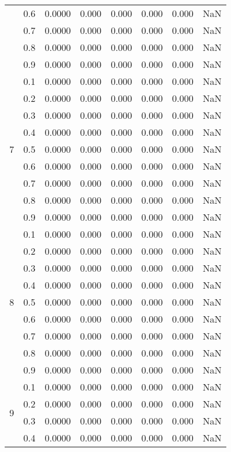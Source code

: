 \documentclass[11pt,a4paper]{report}
\begin{document}
\begin{longtable}{ | c | c || c | c | c | c | c | c | }
 & 0.6 & 0.0000 & 0.000 & 0.000 & 0.000 & 0.000 & NaN \\
 & 0.7 & 0.0000 & 0.000 & 0.000 & 0.000 & 0.000 & NaN \\
 & 0.8 & 0.0000 & 0.000 & 0.000 & 0.000 & 0.000 & NaN \\
 & 0.9 & 0.0000 & 0.000 & 0.000 & 0.000 & 0.000 & NaN \\
 \hline
\multirow{9}{*}{7} & 0.1 & 0.0000 & 0.000 & 0.000 & 0.000 & 0.000 & NaN \\
 & 0.2 & 0.0000 & 0.000 & 0.000 & 0.000 & 0.000 & NaN \\
 & 0.3 & 0.0000 & 0.000 & 0.000 & 0.000 & 0.000 & NaN \\
 & 0.4 & 0.0000 & 0.000 & 0.000 & 0.000 & 0.000 & NaN \\
 & 0.5 & 0.0000 & 0.000 & 0.000 & 0.000 & 0.000 & NaN \\
 & 0.6 & 0.0000 & 0.000 & 0.000 & 0.000 & 0.000 & NaN \\
 & 0.7 & 0.0000 & 0.000 & 0.000 & 0.000 & 0.000 & NaN \\
 & 0.8 & 0.0000 & 0.000 & 0.000 & 0.000 & 0.000 & NaN \\
 & 0.9 & 0.0000 & 0.000 & 0.000 & 0.000 & 0.000 & NaN \\
 \hline
\multirow{9}{*}{8} & 0.1 & 0.0000 & 0.000 & 0.000 & 0.000 & 0.000 & NaN \\
 & 0.2 & 0.0000 & 0.000 & 0.000 & 0.000 & 0.000 & NaN \\
 & 0.3 & 0.0000 & 0.000 & 0.000 & 0.000 & 0.000 & NaN \\
 & 0.4 & 0.0000 & 0.000 & 0.000 & 0.000 & 0.000 & NaN \\
 & 0.5 & 0.0000 & 0.000 & 0.000 & 0.000 & 0.000 & NaN \\
 & 0.6 & 0.0000 & 0.000 & 0.000 & 0.000 & 0.000 & NaN \\
 & 0.7 & 0.0000 & 0.000 & 0.000 & 0.000 & 0.000 & NaN \\
 & 0.8 & 0.0000 & 0.000 & 0.000 & 0.000 & 0.000 & NaN \\
 & 0.9 & 0.0000 & 0.000 & 0.000 & 0.000 & 0.000 & NaN \\
 \hline
\multirow{9}{*}{9} & 0.1 & 0.0000 & 0.000 & 0.000 & 0.000 & 0.000 & NaN \\
 & 0.2 & 0.0000 & 0.000 & 0.000 & 0.000 & 0.000 & NaN \\
 & 0.3 & 0.0000 & 0.000 & 0.000 & 0.000 & 0.000 & NaN \\
 & 0.4 & 0.0000 & 0.000 & 0.000 & 0.000 & 0.000 & NaN \\

\end{longtable}
\end{document}
